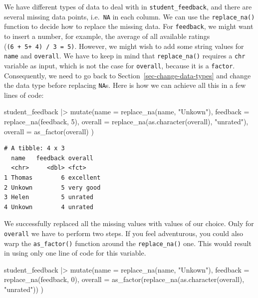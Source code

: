 \documentclass[
  letterpaper,
]{krantz}
\makeatletter
\newenvironment{Shaded}{\begin{snugshade}}{\end{snugshade}}
\newcommand{\AttributeTok}[1]{\textcolor[rgb]{0.40,0.45,0.13}{#1}}
\newcommand{\DecValTok}[1]{\textcolor[rgb]{0.68,0.00,0.00}{#1}}
\newcommand{\FunctionTok}[1]{\textcolor[rgb]{0.28,0.35,0.67}{#1}}
\newcommand{\NormalTok}[1]{\textcolor[rgb]{0.00,0.23,0.31}{#1}}
\newcommand{\SpecialCharTok}[1]{\textcolor[rgb]{0.37,0.37,0.37}{#1}}
\newcommand{\StringTok}[1]{\textcolor[rgb]{0.13,0.47,0.30}{#1}}
\newenvironment{kframe}{%
\medskip{}
\setlength{\fboxsep}{.8em}
 \def\at@end@of@kframe{}%
 \ifinner\ifhmode%
  \def\at@end@of@kframe{\end{minipage}}%
  \begin{minipage}{\columnwidth}%
 \fi\fi%
 \def\FrameCommand##1{\hskip\@totalleftmargin \hskip-\fboxsep
 \colorbox{shadecolor}{##1}\hskip-\fboxsep
     \hskip-\linewidth \hskip-\@totalleftmargin \hskip\columnwidth}%
 \MakeFramed {\advance\hsize-\width
   \@totalleftmargin\z@ \linewidth\hsize
   \@setminipage}}%
 {\par\unskip\endMakeFramed%
 \at@end@of@kframe}
\renewenvironment{Shaded}{\begin{kframe}}{\end{kframe}}
\makeatother
\begin{document}
We have different types of data to deal with in
\texttt{student\_feedback}, and there are several missing data points,
i.e.~\texttt{NA} in each column. We can use the \texttt{replace\_na()}
function to decide how to replace the missing data. For
\texttt{feedback}, we might want to insert a number, for example, the
average of all available ratings (\texttt{(6\ +\ 5+\ 4)\ /\ 3\ =\ 5)}.
However, we might wish to add some string values for \texttt{name} and
\texttt{overall}. We have to keep in mind that \texttt{replace\_na()}
requires a \texttt{chr} variable as input, which is not the case for
\texttt{overall}, because it is a \texttt{factor}. Consequently, we need
to go back to Section~\ref{sec-change-data-types} and change the data
type before replacing \texttt{NA}s. Here is how we can achieve all this
in a few lines of code:

\begin{Shaded}
\begin{Highlighting}[]
\NormalTok{student\_feedback }\SpecialCharTok{|\textgreater{}}
  \FunctionTok{mutate}\NormalTok{(}\AttributeTok{name =} \FunctionTok{replace\_na}\NormalTok{(name, }\StringTok{"Unkown"}\NormalTok{),}
         \AttributeTok{feedback =} \FunctionTok{replace\_na}\NormalTok{(feedback, }\DecValTok{5}\NormalTok{),}
         \AttributeTok{overall =} \FunctionTok{replace\_na}\NormalTok{(}\FunctionTok{as.character}\NormalTok{(overall), }\StringTok{"unrated"}\NormalTok{),}
         \AttributeTok{overall =} \FunctionTok{as\_factor}\NormalTok{(overall)}
\NormalTok{         )}
\end{Highlighting}
\end{Shaded}

\begin{verbatim}
# A tibble: 4 x 3
  name   feedback overall  
  <chr>     <dbl> <fct>    
1 Thomas        6 excellent
2 Unkown        5 very good
3 Helen         5 unrated  
4 Unkown        4 unrated  
\end{verbatim}

We successfully replaced all the missing values with values of our
choice. Only for \texttt{overall} we have to perform two steps. If you
feel adventurous, you could also warp the \texttt{as\_factor()} function
around the \texttt{replace\_na()} one. This would result in using only
one line of code for this variable.

\begin{Shaded}
\begin{Highlighting}[]
\NormalTok{student\_feedback }\SpecialCharTok{|\textgreater{}}
  \FunctionTok{mutate}\NormalTok{(}\AttributeTok{name =} \FunctionTok{replace\_na}\NormalTok{(name, }\StringTok{"Unkown"}\NormalTok{),}
         \AttributeTok{feedback =} \FunctionTok{replace\_na}\NormalTok{(feedback, }\DecValTok{0}\NormalTok{),}
         \AttributeTok{overall =} \FunctionTok{as\_factor}\NormalTok{(}\FunctionTok{replace\_na}\NormalTok{(}\FunctionTok{as.character}\NormalTok{(overall), }\StringTok{"unrated"}\NormalTok{))}
\NormalTok{         )}
\end{Highlighting}
\end{Shaded}
\end{document}
